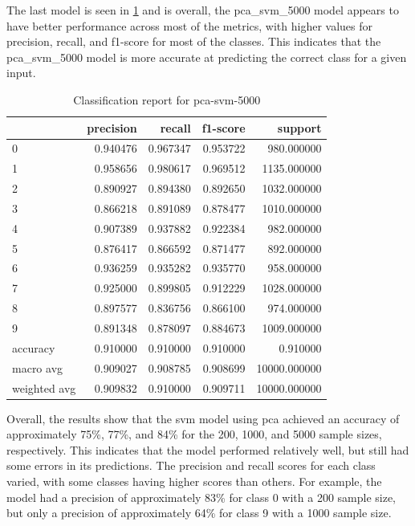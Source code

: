 The last model is seen in \ref{tab:classification-report-pca_svm_5000} and is overall, the pca\_svm\_5000 model appears to have better performance across most of the metrics, with higher values for precision, recall, and f1-score for most of the classes. This indicates that the pca\_svm\_5000 model is more accurate at predicting the correct class for a given input.

\begin{table}[htb!]
    \centering
    \begin{tabular}{lrrrr}
        \toprule
    & precision & recall & f1-score & support \\
    \midrule
    0 & 0.940476 & 0.967347 & 0.953722 & 980.000000 \\
    1 & 0.958656 & 0.980617 & 0.969512 & 1135.000000 \\
    2 & 0.890927 & 0.894380 & 0.892650 & 1032.000000 \\
    3 & 0.866218 & 0.891089 & 0.878477 & 1010.000000 \\
    4 & 0.907389 & 0.937882 & 0.922384 & 982.000000 \\
    5 & 0.876417 & 0.866592 & 0.871477 & 892.000000 \\
    6 & 0.936259 & 0.935282 & 0.935770 & 958.000000 \\
    7 & 0.925000 & 0.899805 & 0.912229 & 1028.000000 \\
    8 & 0.897577 & 0.836756 & 0.866100 & 974.000000 \\
    9 & 0.891348 & 0.878097 & 0.884673 & 1009.000000 \\
    accuracy & 0.910000 & 0.910000 & 0.910000 & 0.910000 \\
    macro avg & 0.909027 & 0.908785 & 0.908699 & 10000.000000 \\
    weighted avg & 0.909832 & 0.910000 & 0.909711 & 10000.000000 \\
    \bottomrule
\end{tabular}
\caption{Classification report for pca-svm-5000}
\label{tab:classification-report-pca_svm_5000}
    \end{table}


Overall, the results show that the \gls{svm} model using \gls{pca} achieved an accuracy of approximately 75\%, 77\%, and 84\% for the 200, 1000, and 5000 sample sizes, respectively. This indicates that the model performed relatively well, but still had some errors in its predictions. The precision and recall scores for each class varied, with some classes having higher scores than others. For example, the model had a precision of approximately 83\% for class 0 with a 200 sample size, but only a precision of approximately 64\% for class 9 with a 1000 sample size.

